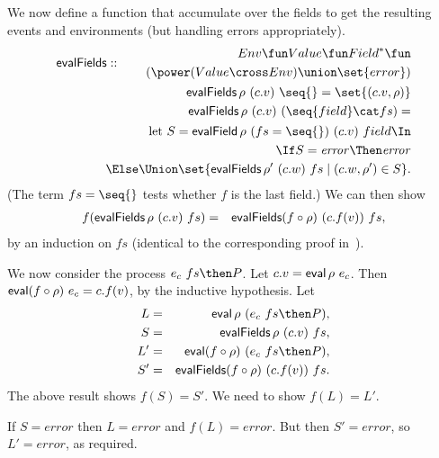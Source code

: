 We now define a function that accumulate over the fields to get the
resulting events and environments (but handling errors appropriately).
\[
\begin{align}
\evalFields :: 
  \begin{align}
  Env \fun  Value \fun Field^* \fun \\
  \qquad (\power (Value \cross Env) \union \set{error})
  \end{align} \\
\evalFields \rho~(c.v)~\seq{} = \set{(c.v,\rho)} \\
\evalFields \rho~(c.v)~(\seq{field} \cat fs)  = \\
\qquad
  \begin{align}
  \Let S = \evalField \rho~(fs=\seq{})~(c.v)~field \In \\
  \If S = \error \Then \error \\
  \Else \Union \set{ \evalFields \rho'~(c.w)~fs \mid  (c.w, \rho') \in S }.
  \end{align}
\end{align}
\]
(The term $fs=\seq{}$ tests whether $f$ is the last field.)
We can then show 
\begin{eqnarray*}%
f(\evalFields \rho~(c.v)~fs) & = & 
  \evalFields (f\after\rho)~(c.f(v))~fs ,
\end{eqnarray*}
%
by an induction on $fs$ (identical to the corresponding proof
in~\cite{symmetry-reduction}). 


We now consider the process $e_c~ fs \then P$.  
Let $c.v = \mathop{\sf eval} \rho~e_c$.  Then
$\mathop{\sf eval} (f\circ\rho)~e_c = c.f(v)$, by the inductive hypothesis. 
Let
%
\begin{eqnarray*}
L & = & \eval \rho~ (e_c~ fs \then P), \\
S & = & \evalFields \rho~(c.v)~fs, \\
L' & = &  \eval (f\after\rho)~ (e_c~fs \then P), \\
S' & = & \evalFields (f\after\rho)~(c.f(v))~fs.
\end{eqnarray*}%
%
The above result shows $f(S) = S'$.  We need to show $f(L) = L'$.

If $S = error$ then $L = error$ and $f(L) = error$.  But then $S' = error$,
so $L' = error$, as required. 

